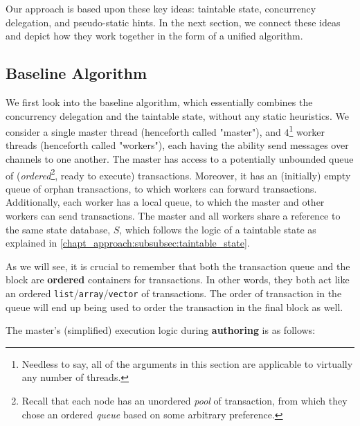 Our approach is based upon these key ideas: taintable state, concurrency delegation, and
pseudo-static hints. In the next section, we connect these ideas and depict how they work together
in the form of a unified algorithm.

\subsection{Baseline Algorithm} \label{subsec:baseline_alg}

We first look into the baseline algorithm, which essentially combines the concurrency delegation and
the taintable state, without any static heuristics. We consider a single master thread (henceforth
called "master"), and $4$\footnote{Needless to say, all of the arguments in this section are
applicable to virtually any number of threads.} worker threads (henceforth called "workers"),
each having the ability send messages over channels to one another. The master has access to a
potentially unbounded queue of (\textit{ordered}\footnote{Recall that each node has an unordered
\textit{pool} of transaction, from which they chose an ordered \textit{queue} based on some
arbitrary preference.}, ready to execute) transactions. Moreover, it has an (initially) empty queue
of orphan transactions, to which workers can forward transactions. Additionally, each worker has a
local queue, to which the master and other workers can send transactions. The master and all workers
share a reference to the same state database, $S$, which follows the logic of a taintable state as
explained in \ref{chapt_approach:subsubsec:taintable_state}.

\begin{remark}
	As we will see, it is crucial to remember that both the transaction queue and the block are
	\textbf{ordered} containers for transactions. In other words, they both act like an ordered
	\texttt{list}/\texttt{array}/\texttt{vector} of transactions. The order of transaction in the
	queue will end up being used to order the transaction in the final block as well.
\end{remark}

The master's (simplified) execution logic during \textbf{authoring} is as follows:

